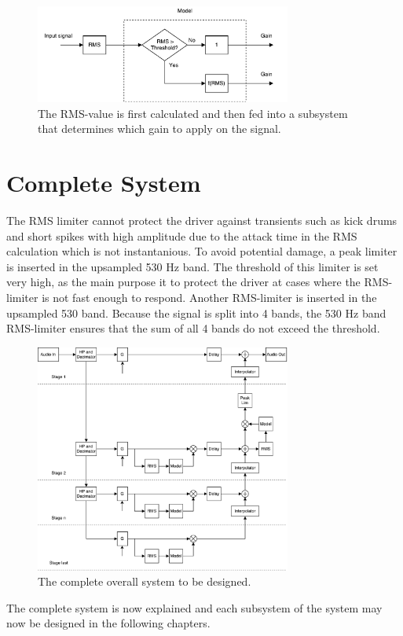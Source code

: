 \begin{figure}[H]
\centering
\includegraphics[width=0.75\textwidth]{figures/designRealRMS.pdf}
\caption{The RMS-value is first calculated and then fed into a subsystem that determines which gain to apply on the signal.}
\label{fig:designRealRMS}
\end{figure}




\section{Complete System}

The RMS limiter cannot protect the driver against transients such as kick drums and short spikes with high amplitude due to the attack time in the RMS calculation which is not instantanious. To avoid potential damage, a peak limiter is inserted in the upsampled 530 Hz band. The threshold of this limiter is set very high, as the main purpose it to protect the driver at cases where the RMS-limiter is not fast enough to respond. Another RMS-limiter is inserted in the upsampled 530 band. Because the signal is split into 4 bands, the 530 Hz band RMS-limiter ensures that the sum of all 4 bands do not exceed the threshold.

\begin{figure}[H]
\centering
\includegraphics[width=0.75\textwidth]{figures/designRealFull.pdf}
\caption{The complete overall system to be designed.}
\label{fig:designRealBlock}
\end{figure}


The complete system is now explained and each subsystem of the system may now be designed in the following chapters.
